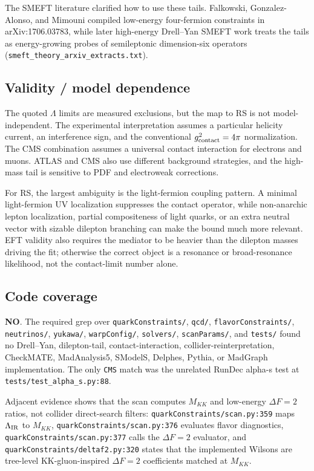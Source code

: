 The SMEFT literature clarified how to use these tails.  Falkowski,
Gonzalez-Alonso, and Mimouni compiled low-energy four-fermion constraints in
arXiv:1706.03783, while later high-energy Drell--Yan SMEFT work treats the
tails as energy-growing probes of semileptonic dimension-six operators
(\texttt{smeft\_theory\_arxiv\_extracts.txt}).

\subsection*{Validity / model dependence}
The quoted \(\Lambda\) limits are measured exclusions, but the map to RS is
not model-independent.  The experimental interpretation assumes a particular
helicity current, an interference sign, and the conventional
\(g_{\rm contact}^2=4\pi\) normalization.  The CMS combination assumes a
universal contact interaction for electrons and muons.  ATLAS and CMS also
use different background strategies, and the high-mass tail is sensitive to
PDF and electroweak corrections.

For RS, the largest ambiguity is the light-fermion coupling pattern.  A
minimal light-fermion UV localization suppresses the contact operator, while
non-anarchic lepton localization, partial compositeness of light quarks, or an
extra neutral vector with sizable dilepton branching can make the bound much
more relevant.  EFT validity also requires the mediator to be heavier than the
dilepton masses driving the fit; otherwise the correct object is a resonance
or broad-resonance likelihood, not the contact-limit number alone.

\subsection*{Code coverage}
\textbf{NO}.  The required grep over \texttt{quarkConstraints/}, \texttt{qcd/},
\texttt{flavorConstraints/}, \texttt{neutrinos/}, \texttt{yukawa/},
\texttt{warpConfig/}, \texttt{solvers/}, \texttt{scanParams/}, and
\texttt{tests/} found no Drell--Yan, dilepton-tail, contact-interaction,
collider-reinterpretation, CheckMATE, MadAnalysis5, SModelS, Delphes,
Pythia, or MadGraph implementation.  The only \texttt{CMS} match was the
unrelated RunDec alpha-s test at \texttt{tests/test\_alpha\_s.py:88}.

Adjacent evidence shows that the scan computes \(M_{KK}\) and low-energy
\(\Delta F=2\) ratios, not collider direct-search filters:
\texttt{quarkConstraints/scan.py:359} maps \(\Lambda_{\rm IR}\) to \(M_{KK}\),
\texttt{quarkConstraints/scan.py:376} evaluates flavor diagnostics,
\texttt{quarkConstraints/scan.py:377} calls the \(\Delta F=2\) evaluator, and
\texttt{quarkConstraints/deltaf2.py:320} states that the implemented
Wilsons are tree-level KK-gluon-inspired \(\Delta F=2\) coefficients matched
at \(M_{KK}\).

